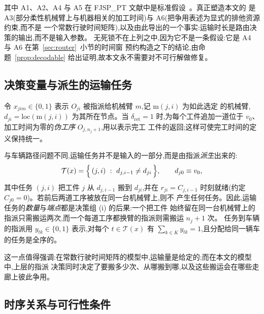 \documentclass[manuscript,screen,review]{acmart}
\begin{document}
其中 A1、A2、A4 与 A5 在 FJSP\_PT 文献中是标准假设~\cite{xin2025review}。真正塑造本文的
是 A3(部分柔性机械臂上与机器相关的加工时间)与 A6(把争用表述为显式的排他资源约束,而不是
一个常数行驶时间矩阵),以及由此导出的一个事实:运输时长是路由决策的输出,而不是输入参数。
无死锁不在上列之中,因为它不是一条假设:它是 A4 与 A6 在第~\ref{sec:router}~小节的时间窗
预约构造之下的结论,由命题~\ref{prop:decodable} 给出证明,故本文永不需要对不可行解做修复。

\subsection{决策变量与派生的运输任务}

令 $x_{jim}\in\{0,1\}$ 表示 $O_{ji}$ 被指派给机械臂 $m$,记 $\mathrm{m}(j,i)$ 为如此选定
的机械臂,$d_{ji}=\mathrm{loc}(\mathrm{m}(j,i))$ 为其所在节点。当 $\delta_{\mathrm{ret}}=1$
时,为每个工件追加一道位于 $v_0$、加工时间为零的\emph{伪工序} $O_{j,n_j+1}$,用以表示完工
工件的返回;这样可使完工时间的定义保持统一。

与车辆路径问题不同,运输任务并不是输入的一部分,而是由指派\emph{派生}出来的:
\begin{equation}
\label{eq:tasks}
\mathcal{T}(x)=\Bigl\{\,(j,i)\ :\ d_{j,i-1}\neq d_{ji}\,\Bigr\},
\qquad d_{j0}\equiv v_0 ,
\end{equation}
其中任务 $(j,i)$ 把工件 $j$ 从 $d_{j,i-1}$ 搬到 $d_{ji}$,并在
$r_{ji}=C_{j,i-1}$ 时刻就绪(约定 $C_{j0}=0$)。若前后两道工序被放在同一台机械臂上,则不
产生任何任务。因此,运输任务的\emph{数量}与\emph{端点}都是决策组 (i) 的后果:一个把工件
始终留在同一台机械臂上的指派只需搬运两次,而一个每道工序都换臂的指派则需搬运 $n_j+1$ 次。
任务到车辆的指派用 $y_{tk}\in\{0,1\}$ 表示,对每个 $t\in\mathcal{T}(x)$ 有
$\sum_{k\in K}y_{tk}=1$,且分配给同一辆车的任务是全序的。

这一点值得强调:在常数行驶时间矩阵的模型中,运输量是给定的;而在本文的模型中,上层的指派
决策同时决定了要搬多少次、从哪搬到哪,以及这些搬运会在哪些走廊上彼此争用。

\subsection{时序关系与可行性条件}
\end{document}
